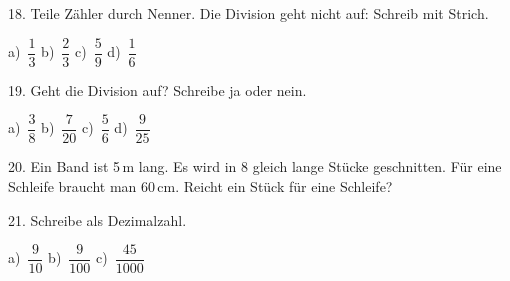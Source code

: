 \documentclass[11pt]{article}
\begin{document}
\begin{pfaufg}{}{18.}{}
Teile Zähler durch Nenner. Die Division geht nicht auf: Schreib mit Strich. \par\vspace{3pt} a)~$\dfrac{1}{3}$ \qquad b)~$\dfrac{2}{3}$ \qquad c)~$\dfrac{5}{9}$ \qquad d)~$\dfrac{1}{6}$
\end{pfaufg}

\begin{pfaufg}{}{19.}{}
Geht die Division auf? Schreibe ja oder nein. \par\vspace{3pt} a)~$\dfrac{3}{8}$ \qquad b)~$\dfrac{7}{20}$ \qquad c)~$\dfrac{5}{6}$ \qquad d)~$\dfrac{9}{25}$
\end{pfaufg}

\begin{pfaufg}{}{20.}{}
Ein Band ist 5\,m lang. Es wird in 8 gleich lange Stücke geschnitten. Für eine Schleife braucht man 60\,cm. Reicht ein Stück für eine Schleife?
\end{pfaufg}

\begin{pfaufg}{}{21.}{}
Schreibe als Dezimalzahl. \par\vspace{3pt} a)~$\dfrac{9}{10}$ \qquad b)~$\dfrac{9}{100}$ \qquad c)~$\dfrac{45}{1000}$
\end{pfaufg}
\end{document}
